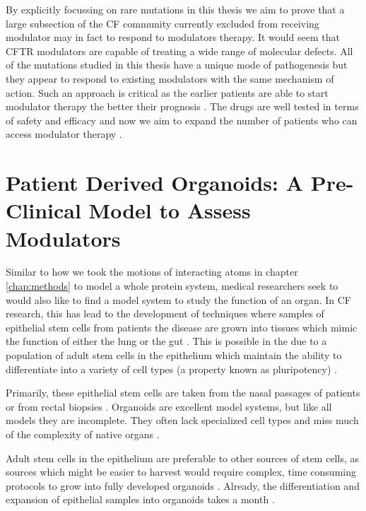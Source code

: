 
By explicitly focussing on rare mutations in this thesis we aim to prove that a large subsection of the CF community currently excluded from receiving modulator may in fact to respond to modulators therapy. It would seem that CFTR modulators are capable of treating a wide range of molecular defects. All of the mutations studied in this thesis have a unique mode of pathogenesis but they appear to respond to existing modulators with the same mechanism of action. Such an approach is critical as the earlier patients are able to start modulator therapy the better their prognosis \cite{lahiri2022}. The drugs are well tested in terms of safety and efficacy and now we aim to expand the number of patients who can access modulator therapy \cite{lahiri2022}.

\section{Patient Derived Organoids: A Pre-Clinical Model to Assess Modulators}
Similar to how we took the motions of interacting atoms in chapter \ref{chap:methods} to model a whole protein system, medical researchers seek to would also like to find a model system to study the function of an organ. In CF research, this has lead to the development of techniques where samples of epithelial stem cells from patients the disease are grown into tissues which mimic the function of either the lung or the gut \cite{wong2015,depoel2020}. This is possible in the due to a population of adult stem cells in the epithelium which maintain the ability to differentiate into a variety of cell types (a property known as pluripotency) \cite{blanpain2007}. 

Primarily, these epithelial stem cells are taken from the nasal passages of patients or from rectal biopsies \cite{}. Organoids are excellent model systems, but like all models they are incomplete. They often lack specialized cell types and miss much of the complexity of native organs \cite{clevers2016}. 

Adult stem cells in the epithelium are preferable to other sources of stem cells, as sources which might be easier to harvest would require complex, time consuming protocols to grow into fully developed organoids \cite{wong2012}. Already, the differentiation and expansion of epithelial samples into organoids takes a month \cite{sato2011}.

